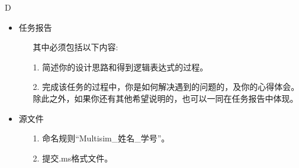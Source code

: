\documentclass[12pt,a4paper]{article}
\begin{document}
\begin{ACEEsubmit}{D}
\begin{itemize}
	\item 任务报告
	\begin{itemize}
		\item[] 其中必须包括以下内容:
		\item[1.] 简述你的设计思路和得到逻辑表达式的过程。
		\item[2.] 完成该任务的过程中，你是如何解决遇到的问题的，及你的心得体会。除此之外，如果你还有其他希望说明的，也可以一同在任务报告中体现。
	\end{itemize}
	\item 源文件
	\begin{itemize}
		\item[1.] 命名规则``Multisim\_姓名\_学号''。
		\item[2.] 提交.ms格式文件。
	\end{itemize}	
\end{itemize}
\end{ACEEsubmit}
\newpage
{}
\end{document}
